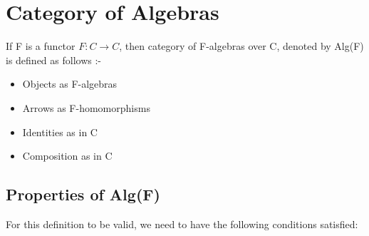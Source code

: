\documentclass{article}
\begin{document}
\section{Category of Algebras}
\label{categoryofalgebras}

If F is a functor $F: C \rightarrow C$, then category of F-algebras over C, denoted by Alg(F) is defined as follows :-

\begin{itemize}
\item{Objects as F-algebras}
\item{Arrows as F-homomorphisms}
\item{Identities as in C}
\item{Composition as in C}
\end{itemize}

\subsection{Properties of Alg(F)}
For this definition to be valid, we need to have the following conditions satisfied:
\end{document}
